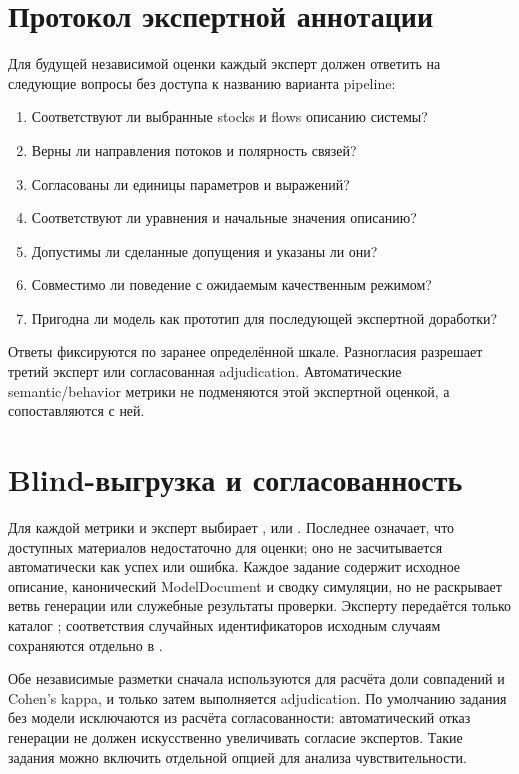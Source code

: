 \section{Протокол экспертной аннотации}

Для будущей независимой оценки каждый эксперт должен ответить на следующие вопросы без доступа к названию варианта pipeline:

\begin{enumerate}
    \item Соответствуют ли выбранные stocks и flows описанию системы?
    \item Верны ли направления потоков и полярность связей?
    \item Согласованы ли единицы параметров и выражений?
    \item Соответствуют ли уравнения и начальные значения описанию?
    \item Допустимы ли сделанные допущения и указаны ли они?
    \item Совместимо ли поведение с ожидаемым качественным режимом?
    \item Пригодна ли модель как прототип для последующей экспертной доработки?
\end{enumerate}

Ответы фиксируются по заранее определённой шкале. Разногласия разрешает третий эксперт или согласованная adjudication. Автоматические semantic/behavior метрики не подменяются этой экспертной оценкой, а сопоставляются с ней.

\section{Blind-выгрузка и согласованность}

Для каждой метрики  и  эксперт выбирает ,  или . Последнее означает, что доступных материалов недостаточно для оценки; оно не засчитывается автоматически как успех или ошибка. Каждое задание содержит исходное описание, канонический ModelDocument и сводку симуляции, но не раскрывает ветвь генерации или служебные результаты проверки. Эксперту передаётся только каталог ; соответствия случайных идентификаторов исходным случаям сохраняются отдельно в .

Обе независимые разметки сначала используются для расчёта доли совпадений и Cohen's kappa, и только затем выполняется adjudication. По умолчанию задания без модели исключаются из расчёта согласованности: автоматический отказ генерации не должен искусственно увеличивать согласие экспертов. Такие задания можно включить отдельной опцией для анализа чувствительности.

